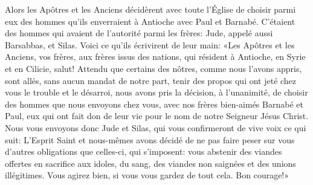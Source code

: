 Alors les Apôtres et les Anciens décidèrent avec toute l’Église
	de choisir parmi eux des hommes
		qu’ils enverraient à Antioche avec Paul et Barnabé.
C’étaient des hommes qui avaient de l’autorité parmi les frères:
	Jude, appelé aussi Barsabbas, et Silas.
Voici ce qu’ils écrivirent de leur main:
	«Les Apôtres et les Anciens, vos frères, aux frères issus des nations,
	qui résident à Antioche, en Syrie et en Cilicie, salut!
Attendu que certains des nôtres, comme nous l’avons appris,
	sont allés, sans aucun mandat de notre part,
	tenir des propos qui ont jeté chez vous le trouble et le désarroi,
	nous avons pris la décision, à l’unanimité,
	de choisir des hommes que nous envoyons chez vous,
	avec nos frères bien-aimés Barnabé et Paul,
	eux qui ont fait don de leur vie pour le nom de notre Seigneur Jésus Christ.
Nous vous envoyons donc Jude et Silas,
	qui vous confirmeront de vive voix ce qui suit:
	L’Esprit Saint et nous-mêmes avons décidé de ne pas faire peser sur vous
	d’autres obligations que celles-ci, qui s’imposent:
	vous abstenir des viandes offertes en sacrifice aux idoles,
	du sang, des viandes non saignées et des unions illégitimes.
Vous agirez bien, si vous vous gardez de tout cela.
	Bon courage!»
